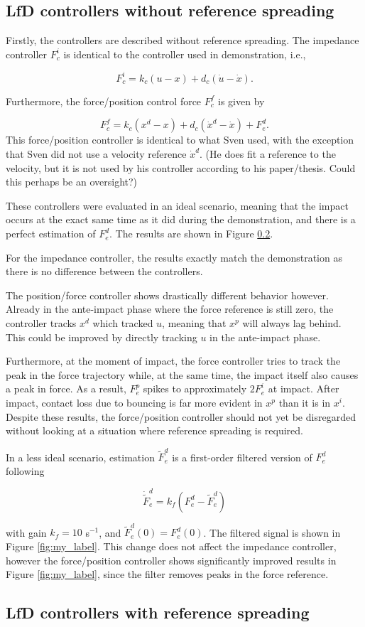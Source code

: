\documentclass[11pt]{report}
\numberwithin{equation}{section}        %
\numberwithin{figure}{section}          %
\numberwithin{table}{section}           %
\begin{document}
  \subsection{LfD controllers without reference spreading}
  Firstly, the controllers are described without reference spreading. The impedance controller $F_c^i$ is identical to the controller used in demonstration, i.e.,

  $$ F_c^i = k_c(u-x)+d_c(\dot{u}-\dot{x}).$$

  Furthermore, the force/position control force $F_c^f$ is given by

  $$ F_c^f = k_c(x^d-x)+d_c(\dot{x}^d-\dot{x}) + F_e^d.$$  
  This force/position controller is identical to what Sven used, with the exception that Sven did not use a velocity reference $\dot{x}^d$. (He does fit a reference to the velocity, but it is not used by his controller according to his paper/thesis. Could this perhaps be an oversight?)

  These controllers were evaluated in an ideal scenario, meaning that the impact occurs at the exact same time as it did during the demonstration, and there is a perfect estimation of $F_e^d$. The results are shown in Figure \ref{}. 

  For the impedance controller, the results exactly match the demonstration as there is no difference between the controllers. 

  The position/force controller shows drastically different behavior however. Already in the ante-impact phase where the force reference is still zero, the controller tracks $x^d$ which tracked $u$, meaning that $x^p$ will always lag behind. This could be improved by directly tracking $u$ in the ante-impact phase.

  Furthermore, at the moment of impact, the force controller tries to track the peak in the force trajectory while, at the same time, the impact itself also causes a peak in force. As a result, $F_e^p$ spikes to approximately $2F_e^i$ at impact. After impact, contact loss due to bouncing is far more evident in $x^p$ than it is in $x^i$. Despite these results, the force/position controller should not yet be disregarded without looking at a situation where reference spreading is required.

  In a less ideal scenario, estimation $\tilde{F}_e^d$ is a first-order filtered version of $F_e^d$ following

  $$\dot{\tilde{F}}_e^d = k_f(F_e^d-\tilde{F}_e^d)$$

  with gain $k_f=10$ s$^{-1}$, and  $\tilde{F}_e^d(0) = F_e^d(0)$. The filtered signal is shown in Figure \ref{fig:my_label}. This change does not affect the impedance controller, however the force/position controller shows significantly improved results in Figure \ref{fig:my_label}, since the filter removes peaks in the force reference. 

\subsection{LfD controllers with reference spreading}


  \newpage
  \printbibliography[title=References]

  \newpage
  \thispagestyle{empty} \ \newpage
\end{document}
